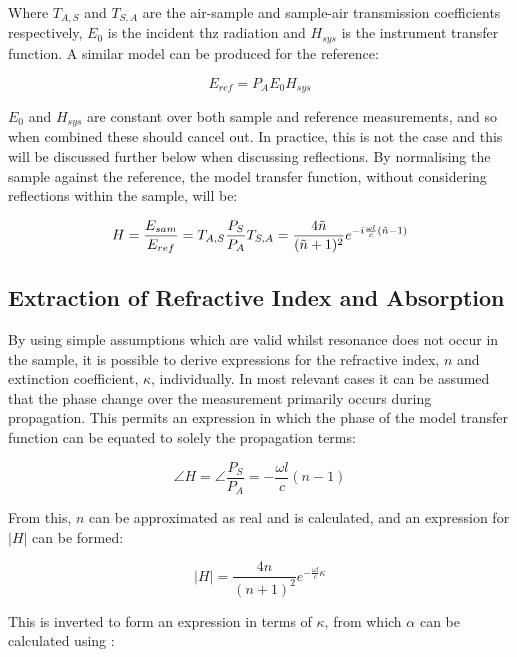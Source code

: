 Where \(T_{A,S}\) and \(T_{S,A}\) are the air-sample and sample-air transmission coefficients respectively, \(E_0\) is the incident \acrshort{thz} radiation and \(H_{sys}\) is the instrument transfer function. A similar model can be produced for the reference:

\begin{equation}
E_{ref} = P_A E_0 H_{sys}
\end{equation}

\(E_0\) and \(H_{sys}\) are constant over both sample and reference measurements, and so when combined these should cancel out. In practice, this is not the case and this will be discussed further below when discussing reflections. By normalising the sample against the reference, the model transfer function, without considering reflections within the sample, will be:

\begin{equation}
H = \frac{E_{sam}}{E_{ref}} = T_{A,S} \frac{P_S}{P_A} T_{S,A} = \frac{4\Tilde{n}}{(\Tilde{n} + 1)^2} e^{-i\frac{\omega l}{c} (\Tilde{n}-1)}
\end{equation}

\subsection{Extraction of Refractive Index and Absorption}
By using simple assumptions which are valid whilst resonance does not occur in the sample, it is possible to derive expressions for the refractive index, \(n\) and extinction coefficient, \(\kappa\), individually.  In most relevant cases it can be assumed that the phase change over the measurement primarily occurs during propagation. This permits an expression in which the phase of the model transfer function can be equated to solely the propagation terms:

\begin{equation}
\angle H = \angle \frac{P_S}{P_A} = -\frac{\omega l}{c}(n-1)
\end{equation}

From this, \(n\) can be approximated as real and is calculated, and an expression for \(|H|\) can be formed:

\begin{equation}
|H| = \frac{4n}{(n+1)^2}e^{-\frac{\omega l}{c}\kappa}
\end{equation}

This is inverted to form an expression in terms of \(\kappa\), from which \(\alpha\) can be calculated using :

